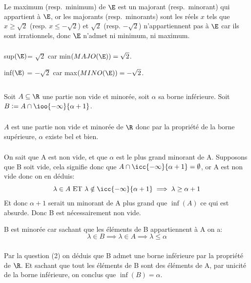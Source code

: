 Le maximum (resp.\ minimum) de $\E$ est un majorant (resp.\ minorant) qui appartient à $\E$, or les majorants (resp.\ minorants) sont les réels $x$ tels que $x \geq \sqrt{2}$ (resp. $x \leq -\sqrt{2}$) et $\sqrt{2}$ (resp. $-\sqrt{2}$) n'appartiennent pas à $\E$ car ils sont irrationnels, donc $\E$ n'admet ni minimum, ni maximum.

\subsubsection*{}

sup$(\E)$= $\sqrt{2}$ car min$(MAJO(\E)) = \sqrt{2}$.

inf$(\E)$ = $-\sqrt{2}$ car max$(MINO(\E)) = -\sqrt{2}$.
\pagebreak

\subsection[Exercice 12:]{}
Soit \(A \subseteq \R\) une partie non vide et minorée, soit \(\alpha\) sa borne inférieure.\+
Soit \(B := A \cap \ioo{-\infty}{\alpha + 1}\).

\subsubsection*{}
\(A\) est une partie non vide et minorée de \(\R\) donc par la propriété de la borne supérieure, \(\alpha\) existe bel et bien.

\subsubsection*{}
On sait que A est non vide, et que \(\alpha\) est le plus grand minorant de A. Supposons que B soit vide, cela signifie donc que \(A \cap \icc{-\infty}{\alpha + 1} = \emptyset\), or A est non vide donc on en déduis:
\[
   \lambda \in A \text{ ET } \lambda \notin \icc{-\infty}{\alpha + 1} \implies \lambda \geq \alpha + 1
\]
Et donc \(\alpha + 1\) serait un minorant de A plus grand que \(\inf(A)\) ce qui est absurde. Donc B est nécessairement non vide.\<

B est minorée car sachant que les éléments de B appartiennent à A on a:
\[
   \lambda \in B \implies \lambda \in A \implies \lambda \leq \alpha   
\]

\subsubsection*{}
Par la question (2) on déduis que B admet une borne inférieure par la propriété de \(\R\). Et sachant que tout les éléments de B sont des éléments de A, par unicité de la borne inférieure, on conclus que \(\inf(B) = \alpha\).
\pagebreak

